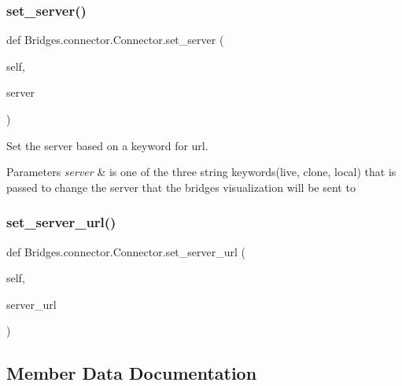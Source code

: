 \subsubsection{\texorpdfstring{set\+\_\+server()}{set\_server()}}
{\footnotesize\ttfamily def Bridges.\+connector.\+Connector.\+set\+\_\+server (\begin{DoxyParamCaption}\item[{}]{self,  }\item[{}]{server }\end{DoxyParamCaption})}



Set the server based on a keyword for url. 


\begin{DoxyParams}{Parameters}
{\em server} & is one of the three string keywords(\textquotesingle{}live\textquotesingle{}, \textquotesingle{}clone\textquotesingle{}, \textquotesingle{}local\textquotesingle{}) that is passed to change the server that the bridges visualization will be sent to \\
\hline
\end{DoxyParams}
\mbox{\label{class_bridges_1_1connector_1_1_connector_a4d94a6661535eabc0d29b9c5fd8c53ea}} 
\subsubsection{\texorpdfstring{set\+\_\+server\+\_\+url()}{set\_server\_url()}}
{\footnotesize\ttfamily def Bridges.\+connector.\+Connector.\+set\+\_\+server\+\_\+url (\begin{DoxyParamCaption}\item[{}]{self,  }\item[{}]{server\+\_\+url }\end{DoxyParamCaption})}



\subsection{Member Data Documentation}
\mbox{\label{class_bridges_1_1connector_1_1_connector_a1f6453ca6554da7ea99be8e55b51b4bf}} 
